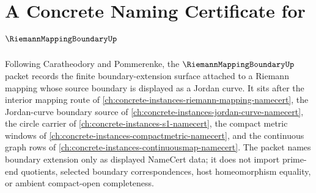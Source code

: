 \chapter{A Concrete Naming Certificate for $\RiemannMappingBoundaryUp$}
\label{ch:concrete-instances-riemann-mapping-boundary-namecert}

Following Caratheodory and Pommerenke, the $\RiemannMappingBoundaryUp$ packet records the finite boundary-extension surface attached to a Riemann mapping whose source boundary is displayed as a Jordan curve. It sits after the interior mapping route of \autoref{ch:concrete-instances-riemann-mapping-namecert}, the Jordan-curve boundary source of \autoref{ch:concrete-instances-jordan-curve-namecert}, the circle carrier of \autoref{ch:concrete-instances-s1-namecert}, the compact metric windows of \autoref{ch:concrete-instances-compactmetric-namecert}, and the continuous graph rows of \autoref{ch:concrete-instances-continuousmap-namecert}. The packet names boundary extension only as displayed NameCert data; it does not import prime-end quotients, selected boundary correspondences, host homeomorphism equality, or ambient compact-open completeness.

